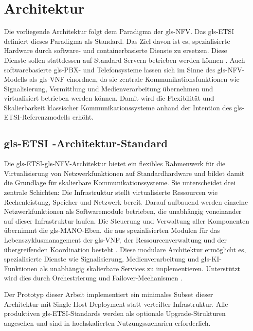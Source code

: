 \chapter{Architektur}
\label{chap:architektur}

Die vorliegende Architektur folgt dem Paradigma der \gls{gls-NFV}. Das \gls{gls-ETSI} definiert dieses Paradigma als Standard. Das Ziel davon ist es, spezialisierte Hardware durch software- und containerbasierte Dienste zu ersetzen. Diese Dienste sollen stattdessen auf Standard-Servern betrieben werden können \parencite{ETSI-NFV}. Auch softwarebasierte \gls{gls-PBX}- und Telefonsysteme lassen sich im Sinne des \gls{gls-NFV}-Modells als \gls{gls-VNF} einordnen, da sie zentrale Kommunikationsfunktionen wie Signalisierung, Vermittlung und Medienverarbeitung übernehmen und virtualisiert betrieben werden können. Damit wird die Flexibilität und Skalierbarkeit klassischer Kommunikationssysteme anhand der Intention des \gls{gls-ETSI}-Referenzmodells erhöht.

\section{\gls{gls-ETSI} -Architektur-Standard}
\label{sec:etsi_nfv_architektur}

Die \gls{gls-ETSI}-\gls{gls-NFV}-Architektur bietet ein flexibles Rahmenwerk für die Virtualisierung von Netzwerkfunktionen auf Standardhardware und bildet damit die Grundlage für skalierbare Kommunikationssysteme. Sie unterscheidet drei zentrale Schichten: Die Infrastruktur stellt virtualisierte Ressourcen wie Rechenleistung, Speicher und Netzwerk bereit. Darauf aufbauend werden einzelne Netzwerkfunktionen als Softwaremodule betrieben, die unabhängig voneinander auf dieser Infrastruktur laufen. Die Steuerung und Verwaltung aller Komponenten übernimmt die \gls{gls-MANO}-Eben, die aus spezialisierten Modulen für das Lebenszyklusmanagement der \gls{gls-VNF}, der Ressourcenverwaltung und der übergreifenden Koordination besteht \parencite{ETSI-NFV}. Diese modulare Architektur ermöglicht es, spezialisierte Dienste wie Signalisierung, Medienverarbeitung und \gls{gls-KI}-Funktionen als unabhängig skalierbare Services zu implementieren. Unterstützt wird dies durch Orchestrierung und Failover-Mechanismen \parencite{ETSI-REL}.

Der Prototyp dieser Arbeit implementiert ein minimales Subset dieser Architektur mit Single-Host-Deployment statt verteilter Infrastruktur. Alle produktiven \gls{gls-ETSI}-Standards werden als optionale Upgrade-Strukturen angesehen und sind in hochskalierten Nutzungsszenarien erforderlich.

